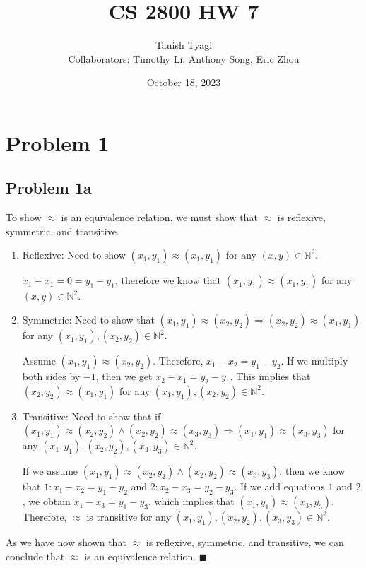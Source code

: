 \documentclass{article}
\title{\textbf{CS 2800 HW 7}}
\author{Tanish Tyagi \\ Collaborators: Timothy Li, Anthony Song, Eric Zhou}
\date{October 18, 2023}
\begin{document}
\maketitle

\section{Problem 1}

\subsection{Problem 1a}

To show $\approx$ is an equivalence relation, we must show that $\approx$ is reflexive, symmetric, and transitive.

\begin{enumerate}

\item Reflexive: Need to show $(x_1, y_1) \approx (x_1, y_1)$ for any $(x, y) \in \mathbb{N}^2$.

$x_1 - x_1 = 0 = y_1 - y_1$, therefore we know that $(x_1, y_1) \approx (x_1, y_1)$ for any $(x, y) \in \mathbb{N}^2$.

\item Symmetric: Need to show that $(x_1, y_1) \approx (x_2, y_2) \Rightarrow (x_2, y_2) \approx (x_1, y_1)$ for any $(x_1, y_1), (x_2, y_2) \in \mathbb{N}^2$.

Assume $(x_1, y_1) \approx (x_2, y_2)$. Therefore, $x_1 - x_2 = y_1 - y_2$. If we multiply both sides by $-1$, then we get $x_2 - x_1 = y_2 - y_1$. This implies that $(x_2, y_2) \approx (x_1, y_1)$ for any $(x_1, y_1), (x_2, y_2) \in \mathbb{N}^2$.

\item Transitive: Need to show that if $(x_1, y_1) \approx (x_2, y_2) \land (x_2, y_2) \approx (x_3, y_3) \Rightarrow (x_1, y_1) \approx (x_3, y_3)$ for any $(x_1, y_1), (x_2, y_2), (x_3, y_3) \in \mathbb{N}^2$.

If we assume $(x_1, y_1) \approx (x_2, y_2) \land (x_2, y_2) \approx (x_3, y_3)$, then we know that $ 1: x_1 - x_2 = y_1 - y_2$ and $2: x_2 - x_3 = y_2 - y_3$. If we add equations $1$ and $2$, we obtain $x_1 - x_3 = y_1 - y_3$, which implies that $(x_1, y_1) \approx (x_3, y_3)$. Therefore, $\approx$ is transitive for any $(x_1, y_1), (x_2, y_2), (x_3, y_3) \in \mathbb{N}^2$.

\end{enumerate}

As we have now shown that $\approx$ is reflexive, symmetric, and transitive, we can conclude that $\approx$ is an equivalence relation.  $\blacksquare$
\end{document}
